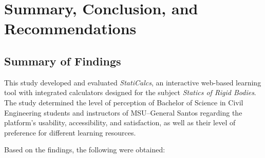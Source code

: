 \chapter{Summary, Conclusion, and Recommendations}\label{ch:5}

\section{Summary of Findings}\label{sec:5-findings}

This study developed and evaluated \textit{StatiCalcs}, an interactive web-based learning tool with integrated calculators designed for the subject \textit{Statics of Rigid Bodies}. The study determined the level of perception of Bachelor of Science in Civil Engineering students and instructors of MSU--General Santos regarding the platform’s usability, accessibility, and satisfaction, as well as their level of preference for different learning resources.

Based on the findings, the following were obtained:

